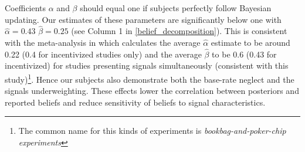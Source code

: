 Coefficients $\alpha$ and $\beta$ should equal one if subjects perfectly follow Bayesian updating. Our estimates of these parameters are significantly below one with $\hat \alpha=0.43$ $\hat \beta=0.25$ (see Column 1 in \ref{belief_decomposition}). This is consistent with the meta-analysis in \citet{benjamin_chapter_2019} which calculates the average $\hat \alpha$ estimate to be around 0.22 (0.4 for incentivized studies only) and the average $\hat \beta$ to be 0.6 (0.43 for incentivized) for studies presenting signals simultaneously (consistent with this study)\footnote{The common name for this kinds of experiments is \textit{bookbag-and-poker-chip experiments}}. Hence our subjects also demonstrate both the base-rate neglect and the signals underweighting. These effects lower the correlation between posteriors and reported beliefs and reduce sensitivity of beliefs to signal characteristics.  



